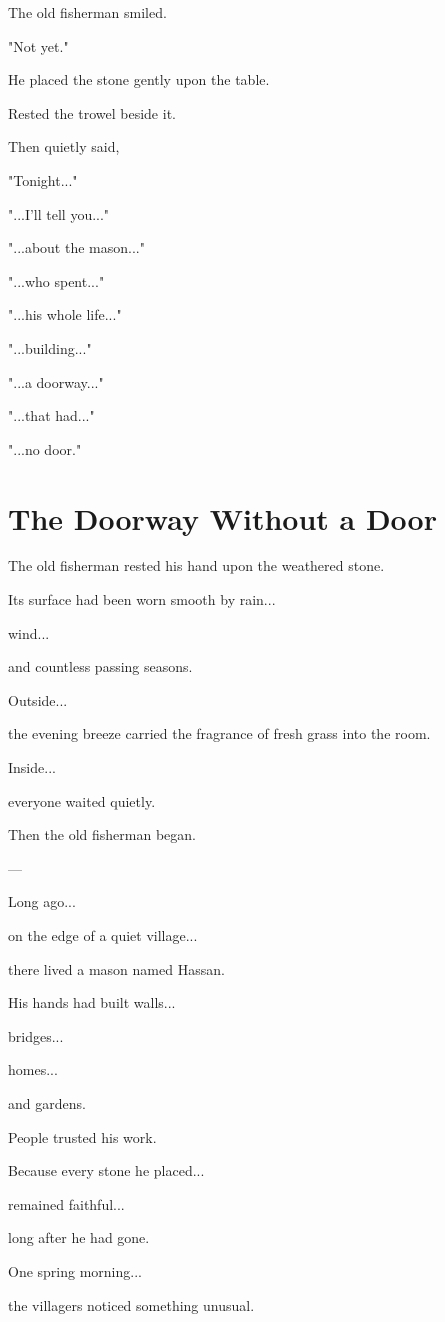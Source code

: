 \documentclass[12pt,openany]{book}
\begin{document}
The old fisherman smiled.

"Not yet."

He placed the stone gently upon the table.

Rested the trowel beside it.

Then quietly said,

"Tonight..."

"...I'll tell you..."

"...about the mason..."

"...who spent..."

"...his whole life..."

"...building..."

"...a doorway..."

"...that had..."

"...no door."
\section*{The Doorway Without a Door}

The old fisherman rested his hand upon the weathered stone.

Its surface had been worn smooth by rain...

wind...

and countless passing seasons.

Outside...

the evening breeze carried the fragrance of fresh grass into the room.

Inside...

everyone waited quietly.

Then the old fisherman began.

---

Long ago...

on the edge of a quiet village...

there lived a mason named Hassan.

His hands had built walls...

bridges...

homes...

and gardens.

People trusted his work.

Because every stone he placed...

remained faithful...

long after he had gone.

One spring morning...

the villagers noticed something unusual.
\end{document}
